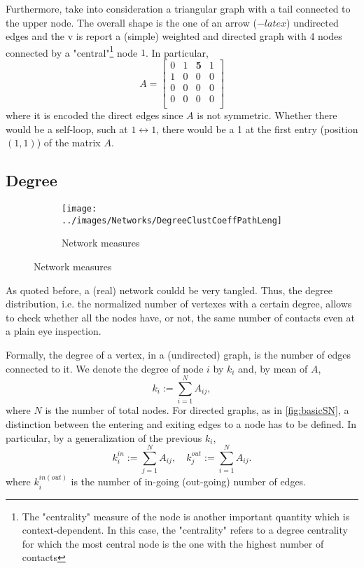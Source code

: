\documentclass[a4paper,10pt, oneside]{book} %
\theoremstyle{definition}
\begin{document}
Furthermore, take into consideration a triangular graph with a tail connected to the upper node. The overall shape is the one of an arrow ($-latex$) undirected edges and the v is report a (simple) weighted and directed graph with 4 nodes connected by a "central"\footnote{The "centrality" measure of the node is another important quantity which is context-dependent. In this case, the "centrality" refers to a degree centrality for which the most central node is the one with the highest number of contacts} node $1$.
In particular,
\[
A = 
\begin{bmatrix}
0 & 1 & \textbf{5} & 1 \\
1 & 0 & 0 & 0 \\
0 & 0 & 0 & 0 \\
0 & 0 & 0 & 0 \\ 
\end{bmatrix}
\]
where it is encoded the direct edges since $A$ is not symmetric. Whether there would be a self-loop, such at $ 1 \longleftrightarrow 1 $, there would be a 1 at the first entry (position $(1,1)$) of the matrix $A$.

\subsection{Degree}

\begin{figure}[ht]
    \begin{subfigure}{\textwidth}
        \texttt{[image: ../images/Networks/DegreeClustCoeffPathLeng]}
        \centering
        \caption{Network measures \cite{Olaf:2011_NonRandomBrain}}
        \label{fig:degree_clustcoefficient_pathlength}
    \end{subfigure}
\end{figure}
As quoted before, a (real) network couldd be very tangled. Thus, the degree distribution, i.e. the normalized number of vertexes with a certain degree, allows to check whether all the nodes have, or not, the same number of contacts even at a plain eye inspection. 

Formally, the degree of a vertex, in a (undirected) graph, is the number of edges connected to it. We denote the degree of node $i$ by $k_i$ and, by mean of $A$, $$k_i := \sum_{i=1}^{N} A_{ij},$$ where $N$ is the number of total nodes.
For directed graphs, as in \autoref{fig:basicSN}, a distinction between the entering and exiting edges to a node has to be defined. In particular, by a generalization of the previous $k_i$, 
\begin{equation}
	k_i^{in} := \sum_{j=1}^N A_{ij}, \quad k_j^{out} := \sum_{i=1}^N A_{ij}.
	\label{eq:kin_kout}	
\end{equation}
where $k_i^{in(out)}$ is the number of in-going (out-going) number of edges. 
\end{document}
